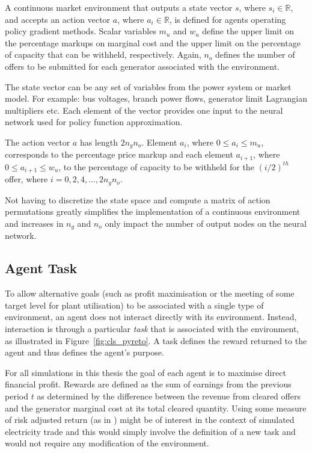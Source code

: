 A continuous market environment that outputs a state vector $s$, where $s_i \in
\mathbb{R}$, and accepts an action vector $a$, where $a_i \in \mathbb{R}$, is
defined for agents operating policy gradient methods.  Scalar variables $m_{u}$
and $w_{u}$ define the upper limit on the percentage markups on marginal cost
and the upper limit on the percentage of capacity that can be withheld,
respectively.  Again, $n_o$ defines the number of offers to be submitted for
each generator associated with the environment.

The state vector can be any set of variables from the power system or market
model.  For example: bus voltages, branch power flows, generator limit
Lagrangian multipliers etc.  Each element of the vector provides one input to
the neural network used for policy function approximation.

The action vector $a$ has length $2n_gn_o$.  Element $a_i$, where $0\leq a_i
\leq m_{u}$, corresponds to the percentage price markup and each element
$a_{i+1}$, where $0\leq a_{i+1} \leq w_{u}$, to the percentage of capacity
to be withheld for the $(i/2)^{th}$ offer, where $i=0,2,4,\dotsc,2n_gn_o$.

Not having to discretize the state space and compute a matrix of action
permutations greatly simplifies the implementation of a continuous environment
and increases in $n_g$ and $n_o$ only impact the number of output nodes
on the neural network.

\subsection{Agent Task}
To allow alternative goals (such as profit maximisation or the meeting of some
target level for plant utilisation) to be associated with a single type of
environment, an agent does not interact directly with its environment.
Instead, interaction is through a particular \textit{task} that is associated
with the environment, as illustrated in Figure~\ref{fig:cls_pyreto}. A task
defines the reward returned to the agent and thus defines the agent's purpose.

For all simulations in this thesis the goal of each agent is to maximise direct
financial profit.  Rewards are defined as the sum of earnings from the previous
period $t$ as determined by the difference between the revenue from cleared
offers and the generator marginal cost at its total cleared quantity.  Using
some measure of risk adjusted return (as in \cite{moody:direct}) might be of
interest in the context of simulated electricity trade and this would simply
involve the definition of a new task and would not require any modification of
the environment.


